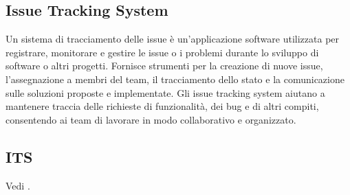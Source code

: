 \vspace{2em}
\subsection*{Issue Tracking System}
\par Un sistema di tracciamento delle issue è un'applicazione software utilizzata per registrare, monitorare e gestire le issue o i problemi durante lo sviluppo di software o altri progetti. Fornisce strumenti per la creazione di nuove issue, l'assegnazione a membri del team, il tracciamento dello stato e la comunicazione sulle soluzioni proposte e implementate. Gli issue tracking system aiutano a mantenere traccia delle richieste di funzionalità, dei bug e di altri compiti, consentendo ai team di lavorare in modo collaborativo e organizzato.

\vspace{2em}
\subsection*{ITS}
\par Vedi .
